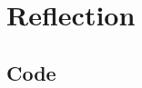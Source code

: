 \documentclass[12pt,twosided]{report}
\begin{document}
\chapter{Reflection}
\label{chap:Reflection}


\begin{appendices}

  
\chapter{Code}

\end{appendices}

\printbibliography[heading=bibintoc,title={References}]
\end{document}
